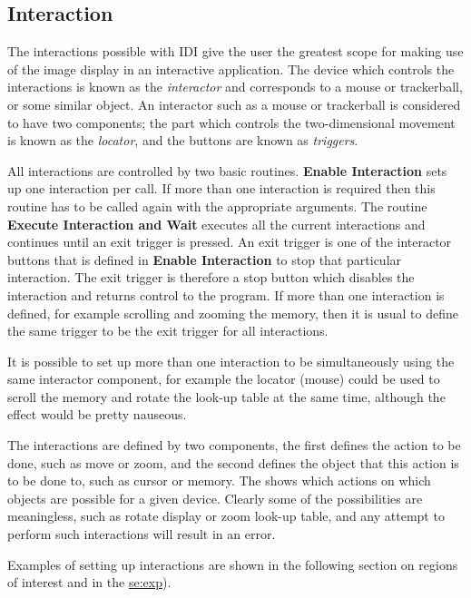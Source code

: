 \subsection{Interaction}

The interactions possible with IDI give the user the greatest scope for
making use of the image display in an interactive application. The
device which controls the interactions is known as the {\it interactor}
and corresponds to a mouse or trackerball, or some similar object.
An interactor such as a mouse or trackerball is considered to have two
components; the part which controls the two-dimensional movement is
known as the {\it locator}, and the buttons are known as {\it triggers}.

All interactions are controlled by two basic routines. {\bf Enable
Interaction} sets up one interaction per call. If more than one
interaction is required then this routine has to be called again with
the appropriate arguments. The routine {\bf Execute Interaction and
Wait} executes all the current interactions and continues until an exit
trigger is pressed. An exit trigger is one of the interactor buttons that
is defined in {\bf Enable Interaction} to stop that particular interaction.
The exit trigger is therefore a stop button which disables the interaction
and returns control to the program.
If more than one interaction is defined, for example scrolling and zooming
the memory, then it is usual to define the same trigger to be the exit
trigger for all interactions.

It is possible to set up more than one interaction to be simultaneously
using the same interactor component, for example the locator (mouse)
could be used to scroll the memory and rotate the look-up table at the
same time, although the effect would be pretty nauseous.

The interactions are defined by two components, the first defines the
action to be done, such as move or zoom, and the second defines the object
that this action is to be done to, such as cursor or memory.
The 
shows which actions on which objects are possible for a given
device. Clearly some of the possibilities are meaningless, such as rotate
display or zoom look-up table, and any attempt to perform such interactions
will result in an error.

Examples of setting up interactions are shown in the following section on
regions of interest and in the 
\hyperref{example program}{example program (appendix~}{}{se:exp}).

